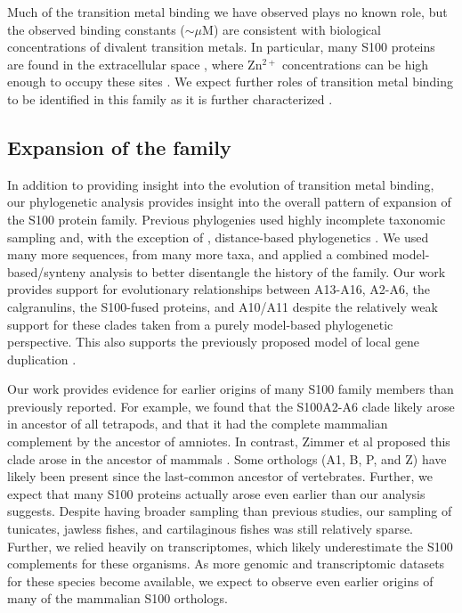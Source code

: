 Much of the transition metal binding we have observed plays no known
role, but the observed binding constants ($\sim$$\mu$M) are consistent
with biological concentrations of divalent transition metals. In particular,
many S100 proteins are found in the extracellular space \cite{donato_intracellular_2003},
where Zn$^{2+}$ concentrations can be high enough to occupy these
sites \cite{hopt_methods_2003,hyun_zinc_2004}. We expect further
roles of transition metal binding to be identified in this family
as it is further characterized \cite{moroz_role_2010,gilston_binding_2016}.

\subsection{Expansion of the family}

In addition to providing insight into the evolution of transition
metal binding, our phylogenetic analysis provides insight into the
overall pattern of expansion of the S100 protein family. Previous
phylogenies used highly incomplete taxonomic sampling and, with the
exception of \cite{kraemer_structural_2008}, distance-based phylogenetics
\cite{zimmer_evolution_2013,marenholz_s100_2004,shang_chromosomal_2008}.
We used many more sequences, from many more taxa, and applied a combined
model-based/synteny analysis to better disentangle the history of
the family. Our work provides support for evolutionary relationships
between A13-A16, A2-A6, the calgranulins, the S100-fused proteins,
and A10/A11 despite the relatively weak support for these clades taken
from a purely model-based phylogenetic perspective. This also supports
the previously proposed model of local gene duplication \cite{zimmer_evolution_2013,marenholz_s100_2004,shang_chromosomal_2008}.

Our work provides evidence for earlier origins of many S100 family
members than previously reported. For example, we found that the S100A2-A6
clade likely arose in ancestor of all tetrapods, and that it had the
complete mammalian complement by the ancestor of amniotes. In contrast,
Zimmer et al proposed this clade arose in the ancestor of mammals
\cite{zimmer_evolution_2013}. Some orthologs (A1, B, P, and Z) have
likely been present since the last-common ancestor of vertebrates.
Further, we expect that many S100 proteins actually arose even earlier
than our analysis suggests. Despite having broader sampling than previous
studies, our sampling of tunicates, jawless fishes, and cartilaginous
fishes was still relatively sparse. Further, we relied heavily on
transcriptomes, which likely underestimate the S100 complements for
these organisms. As more genomic and transcriptomic datasets for these
species become available, we expect to observe even earlier origins
of many of the mammalian S100 orthologs.

